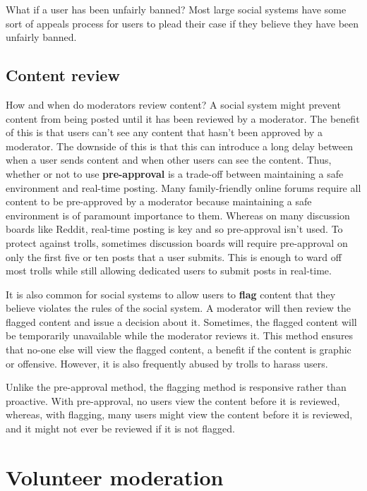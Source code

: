 \documentclass[class=book, crop=false]{standalone}
\providecommand{\keyterm}[1]{\textbf{#1}\marginnote{\scriptsize \textbf{#1}}}
\begin{document}
What if a user has been unfairly banned? Most large social systems have some sort of appeals process for users to plead their case if they believe they have been unfairly banned.

\subsection{Content review}

How and when do moderators review content? A social system might prevent content from being posted until it has been reviewed by a moderator. The benefit of this is that users can't see any content that hasn't been approved by a moderator. The downside of this is that this can introduce a long delay between when a user sends content and when other users can see the content. Thus, whether or not to use \keyterm{pre-approval} is a trade-off between maintaining a safe environment and real-time posting. Many family-friendly online forums require all content to be pre-approved by a moderator because maintaining a safe environment is of paramount importance to them. Whereas on many discussion boards like Reddit, real-time posting is key and so pre-approval isn't used. To protect against trolls, sometimes discussion boards will require pre-approval on only the first five or ten posts that a user submits. This is enough to ward off most trolls while still allowing dedicated users to submit posts in real-time.

It is also common for social systems to allow users to \keyterm{flag} content that they believe violates the rules of the social system. A moderator will then review the flagged content and issue a decision about it. Sometimes, the flagged content will be temporarily unavailable while the moderator reviews it. This method ensures that no-one else will view the flagged content, a benefit if the content is graphic or offensive. However, it is also frequently abused by trolls to harass users.

Unlike the pre-approval method, the flagging method is responsive rather than proactive. With pre-approval, no users view the content before it is reviewed, whereas, with flagging, many users might view the content before it is reviewed, and it might not ever be reviewed if it is not flagged.

\section{Volunteer moderation}
\end{document}
